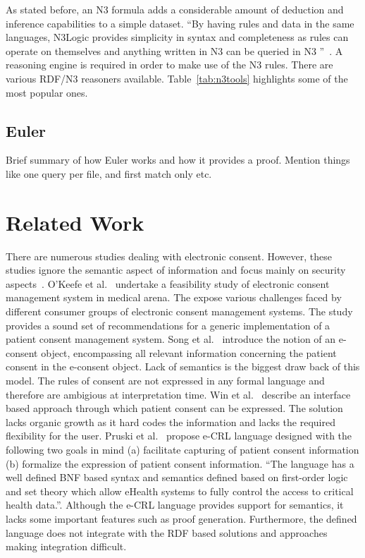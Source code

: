 \documentclass[conference]{IEEEtran}
\begin{document}
As stated before, an N3 formula adds a considerable amount of deduction and inference capabilities to a simple dataset.  “By having rules and data in the same
languages, N3Logic provides simplicity in syntax and completeness as rules can operate on themselves and anything written in N3 can be queried in N3
”~\cite{berners-lee2008}. A reasoning engine is required in order to make use of the N3 rules.  There are various RDF/N3 reasoners available.
Table~\ref{tab:n3tools} highlights some of the most popular ones.


\subsection{Euler}

Brief summary of how Euler works and how it provides a proof. Mention things like one query per file, and first match only etc.


\section{Related Work}
\label{rel-work}

There are numerous studies dealing with electronic consent. However, these studies ignore the semantic aspect of information and focus
mainly on security aspects~\cite{reid2003, chen2009identity, blobel2004authorisation}. O'Keefe et al.~\cite{okeefe2002implementation} undertake a feasibility
study of electronic consent management system in medical arena. The expose various challenges faced by different consumer groups of electronic consent
management systems.  The study provides a sound set of recommendations for a generic implementation of a patient consent management system.
Song et al.~\cite{song2002patient} introduce the notion of an e-consent object, encompassing all relevant information concerning the patient consent in the
e-consent object. Lack of semantics is the biggest draw back of this model.  The rules of consent are not expressed in any formal language and therefore are
ambigious at interpretation time.
Win et al.~\cite{win2002implementing} describe an interface based approach through which patient consent can be expressed.  The solution lacks organic growth as
it hard codes the information and lacks the required flexibility for the user.
Pruski et al.~\cite{pruski2010} propose e-CRL language designed with the following two goals in mind (a) facilitate capturing of patient consent information (b)
formalize the expression of patient consent information.  “The language has a well defined BNF based syntax and semantics defined based on first-order logic and
set theory which allow eHealth systems to fully control the access to critical health data.”.  Although the e-CRL language provides support for semantics,
it lacks some important features such as proof generation.  Furthermore, the defined language does not integrate with the RDF based solutions and approaches
making integration difficult.
\end{document}
